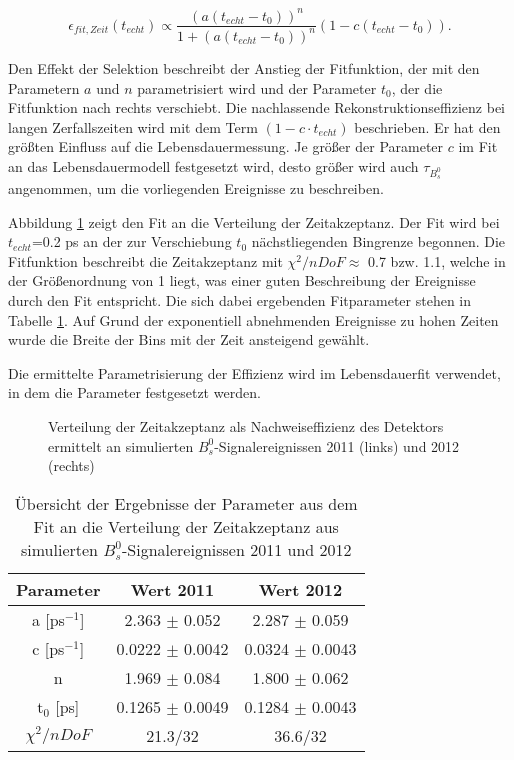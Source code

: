 \documentclass{article}
\begin{document}
\[\epsilon_{fit,Zeit}(t_{echt}) \propto \frac{(a(t_{echt}-t_0))^n}{1+(a(t_{echt}-t_0))^n}(1-c(t_{echt}-t_0)).\]

Den Effekt der Selektion beschreibt der Anstieg der Fitfunktion, der mit den Parametern $a$ und $n$ parametrisiert wird und der Parameter $t_0$, der die Fitfunktion nach rechts verschiebt. Die nachlassende Rekonstruktionseffizienz bei langen Zerfallszeiten wird mit dem Term $(1-c\cdot t_{echt})$ beschrieben. Er hat den größten Einfluss auf die Lebensdauermessung. Je größer der Parameter $c$ im Fit an das Lebensdauermodell festgesetzt wird, desto größer wird auch $\tau_{B_s^0}$ angenommen, um die vorliegenden Ereignisse zu beschreiben. 


Abbildung \ref{fig:ctac} zeigt den Fit an die Verteilung der Zeitakzeptanz. Der Fit wird bei $t_{echt}$=0.2 ps an der zur Verschiebung $t_0$ nächstliegenden Bingrenze begonnen. Die Fitfunktion beschreibt die Zeitakzeptanz mit $\chi^2/nDoF \approx$ 0.7 bzw. 1.1, welche in der Größenordnung von 1 liegt, was einer guten Beschreibung der Ereignisse durch den Fit entspricht. Die sich dabei ergebenden Fitparameter stehen in Tabelle \ref{table:ctacfit}. Auf Grund der exponentiell abnehmenden Ereignisse zu hohen Zeiten wurde die Breite der Bins mit der Zeit ansteigend gewählt. 

Die ermittelte Parametrisierung der Effizienz wird im Lebensdauerfit verwendet, in dem die Parameter festgesetzt werden.


\begin{figure}[h!]
\caption{Verteilung der Zeitakzeptanz als Nachweiseffizienz des Detektors ermittelt an simulierten $B_s^0$-Signalereignissen 2011 (links) und 2012 (rechts)}
\label{fig:ctac}
\end{figure} 

\begin{table}[h!]
\noindent\begin{centering}
\begin{tabular}{c|c|c}
Parameter & Wert 2011 & Wert 2012 \tabularnewline
\hline 
a [ps$^{-1}$]& 2.363 $\pm$ 0.052  & 2.287 $\pm$ 0.059 \tabularnewline
c [ps$^{-1}$]& 0.0222 $\pm$ 0.0042  & 0.0324 $\pm$ 0.0043 \tabularnewline
n & 1.969 $\pm$ 0.084  & 1.800 $\pm$ 0.062 \tabularnewline
t$_0$ [ps] & 0.1265 $\pm$ 0.0049  & 0.1284 $\pm$ 0.0043 \tabularnewline
\hline
$\chi^2/nDoF$ & 21.3/32 & 36.6/32 \tabularnewline
\end{tabular}
\par \end{centering}
\caption{Übersicht der Ergebnisse der Parameter aus dem Fit an die Verteilung der Zeitakzeptanz aus simulierten $B_s^0$-Signalereignissen 2011 und 2012}
\label{table:ctacfit}
\end{table}
\end{document}

